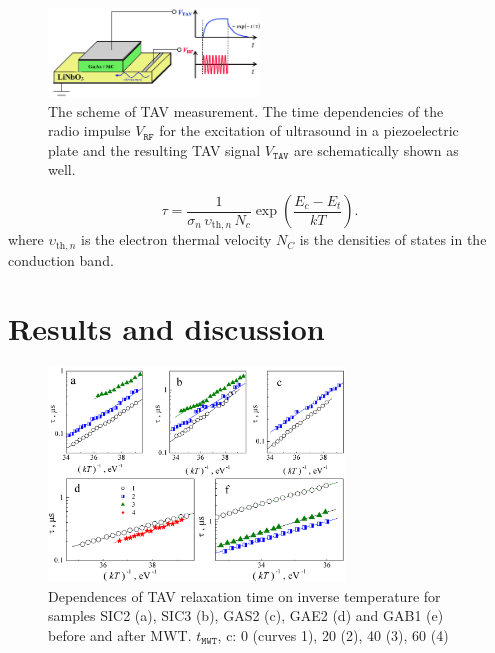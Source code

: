 \documentclass[final,3p,times,twocolumn,authoryear]{elsarticle}
\begin{document}
\begin{figure}
\center
\includegraphics[width=0.5\textwidth]{fig2}
\caption{\label{figTAV}
The scheme of TAV measurement.
The time dependencies of the radio impulse $V_\mathtt{RF}$ for the excitation of ultrasound in a piezoelectric plate and the resulting TAV signal $V_\mathtt{TAV}$ are schematically shown as well.
}%
\end{figure}


\cite{OstrovPAN,OstrovskiiSST}

\begin{equation}\label{eqPANtau}
  \tau=\frac{1}{\sigma_n\,\upsilon_{\mathrm{th},n}\,N_c}\exp\left(\frac{E_c-E_t}{kT}\right).
\end{equation}
where
$\upsilon_{\mathrm{th},n}$ is the electron thermal velocity
$N_C$ is the densities of states in the conduction band.


\cite{Godwod}


\cite{Belyaev1998JTFEn}

\section{Results and discussion}\label{sec3}


\begin{figure}
\center
\includegraphics[width=0.7\textwidth]{Fig3}
\caption{\label{figTauTAV}
Dependences of TAV relaxation time on inverse temperature for samples SIC2 (a), SIC3 (b), GAS2 (c), GAE2 (d) and GAB1 (e) before and after MWT.
$t_\mathtt{MWT}$, c: 0 (curves 1), 20 (2), 40 (3), 60 (4)
}%
\end{figure}
\end{document}
